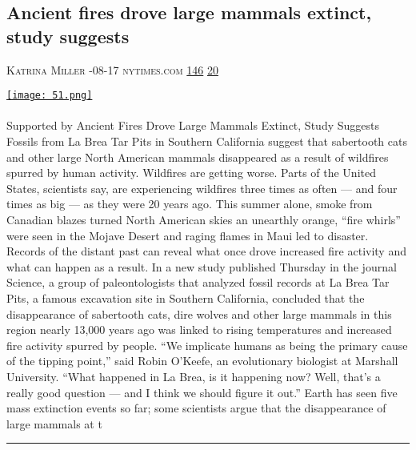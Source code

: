 \documentclass[10pt,a4paper]{article}
\begin{document}
\begin{multicols*}{2}
\begin{minipage}{\linewidth}
\subsection{Ancient fires drove large mammals extinct, study suggests}
\textsc{\footnotesize
{\scriptsize\faUser}\space 
Katrina Miller 
{\scriptsize\faCalendar}-08-17 
{\scriptsize\faGlobe}\space 
nytimes.com 
{\scriptsize\faThumbsOUp}\space 
\href{http://news.ycombinator.com/item?id=37166986\&utm\_term=comment}{146} 
{\scriptsize\faComments}\space 
\href{http://news.ycombinator.com/item?id=37166986\&utm\_term=comment}{20} 
}
\par\medskip\noindent
\href{https://www.nytimes.com/2023/08/17/science/climate-paleontology-mammals.html?utm\_source=hackernewsletter\&utm\_medium=email\&utm\_term=learn}{
    \texttt{[image: 51.png]}
}
\end{minipage}
\paragraph{}
Supported by
Ancient Fires Drove Large Mammals Extinct, Study Suggests
Fossils from La Brea Tar Pits in Southern California suggest that sabertooth cats and other large North American mammals disappeared as a result of wildfires spurred by human activity.
Wildfires are getting worse. Parts of the United States, scientists say, are experiencing wildfires three times as often — and four times as big — as they were 20 years ago. This summer alone, smoke from Canadian blazes turned North American skies an unearthly orange, “fire whirls” were seen in the Mojave Desert and raging flames in Maui led to disaster.
Records of the distant past can reveal what once drove increased fire activity and what can happen as a result. In a new study published Thursday in the journal Science, a group of paleontologists that analyzed fossil records at La Brea Tar Pits, a famous excavation site in Southern California, concluded that the disappearance of sabertooth cats, dire wolves and other large mammals in this region nearly 13,000 years ago was linked to rising temperatures and increased fire activity spurred by people.
“We implicate humans as being the primary cause of the tipping point,” said Robin O’Keefe, an evolutionary biologist at Marshall University. “What happened in La Brea, is it happening now? Well, that’s a really good question — and I think we should figure it out.”
Earth has seen five mass extinction events so far; some scientists argue that the disappearance of large mammals at t
\par\noindent\textcolor{red}{\rule{\linewidth}{0.2mm}}
\vfill
\null
\noindent\begin{minipage}{\linewidth}

\end{minipage}
\end{multicols*}
\end{document}
